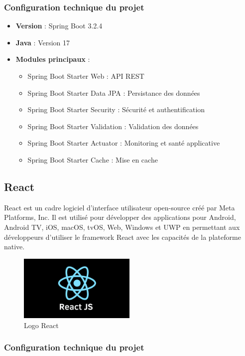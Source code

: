 \documentclass[12pt,a4paper]{report}
\begin{document}
\subsubsection{Configuration technique du projet}

\begin{itemize}
\item \textbf{Version} : Spring Boot 3.2.4
\item \textbf{Java} : Version 17
\item \textbf{Modules principaux} :
  \begin{itemize}
  \item Spring Boot Starter Web : API REST
  \item Spring Boot Starter Data JPA : Persistance des données
  \item Spring Boot Starter Security : Sécurité et authentification
  \item Spring Boot Starter Validation : Validation des données
  \item Spring Boot Starter Actuator : Monitoring et santé applicative
  \item Spring Boot Starter Cache : Mise en cache
  \end{itemize}
\end{itemize}

\subsection{React}

React est un cadre logiciel d'interface utilisateur open-source créé par Meta Platforms, Inc. Il est utilisé pour développer des applications pour Android, Android TV, iOS, macOS, tvOS, Web, Windows et UWP en permettant aux développeurs d'utiliser le framework React avec les capacités de la plateforme native.

\begin{figure}[H]
\centering
\includegraphics[width=0.5\textwidth]{latex_media/media/image24.png}
\caption{Logo React}
\label{fig:logo-react}
\end{figure}

\subsubsection{Configuration technique du projet}
\end{document}
